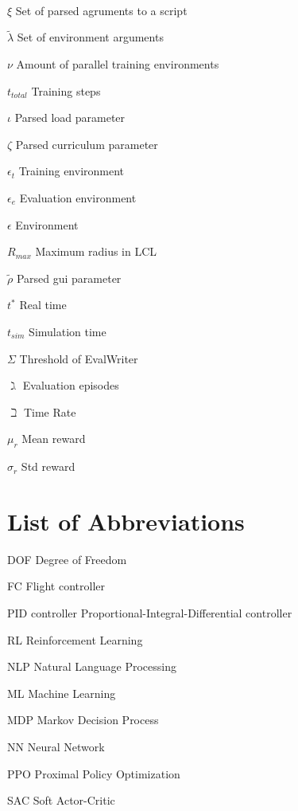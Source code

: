\documentclass[bachelor,english]{infothesis}
\begin{document}
\begin{description}
	\\
	\item $\xi$ \dotfill Set of parsed agruments to a script
	\item $\tilde{\lambda}$ \dotfill Set of environment arguments
	\item $\nu$ \dotfill Amount of parallel training environments
	\item $t_{total}$ \dotfill Training steps
	\item $\iota$ \dotfill Parsed load parameter
	\item $\zeta$ \dotfill Parsed curriculum parameter
	\item  $\epsilon_t$ \dotfill Training environment
	\item $\epsilon_e$ \dotfill Evaluation environment
	\item $\epsilon$ \dotfill Environment
	\item $R_{max}$ \dotfill Maximum radius in LCL
	\item $\tilde{\rho}$ \dotfill Parsed gui parameter
	\item $t^*$ \dotfill Real time
	\item  $t_{sim}$ \dotfill Simulation time
	\item $\Sigma$ \dotfill Threshold of EvalWriter
	\item $\gimel$ \dotfill Evaluation episodes
	\item $\beth$ \dotfill Time Rate
	\item $\mu_r$ \dotfill Mean reward
	\item $\sigma_r$ \dotfill Std reward
\end{description}

\chapter*{List of Abbreviations}

\begin{description}
	\item DOF \dotfill Degree of Freedom
	\item FC \dotfill Flight controller
	\item PID controller \dotfill Proportional-Integral-Differential controller
	\item RL \dotfill Reinforcement Learning
	\item NLP \dotfill Natural Language Processing
	\item ML \dotfill Machine Learning
	\item MDP \dotfill Markov Decision Process
	\item NN \dotfill Neural Network
	\item PPO \dotfill Proximal Policy Optimization
	\item SAC \dotfill Soft Actor-Critic
\end{description}

\clearpage


\end{document}
